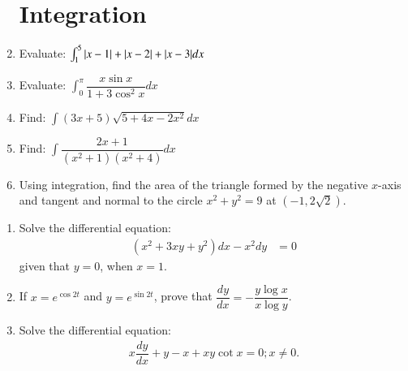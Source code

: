 \documentclass[12pt,-letter paper]{article}
\providecommand{\brak}[1]{\ensuremath{\left(#1\right)}}
\begin{document}
\begin{enumerate}
\section*{Integration}
\item Evaluate: $\int^5_1{\abs{x-1} + \abs{x-2} + \abs{x-3} dx}$
\item Evaluate: $ \int^{\pi}_0{\dfrac{x\sin{x}}{1 + 3\cos^2{x}}dx}$
\item Find: $\int{\brak{3x+5}\sqrt{5 + 4x - 2x^2}dx}$
\item Find: $\int{\dfrac{2x+1}{\brak{x^2 + 1}\brak{x^2 + 4}}dx}$
\item Using integration, find the area of the triangle formed by the negative $x$-axis and tangent and normal to the circle $x^2 + y^2 = 9$ at $\brak{-1,2\sqrt{2}}$.
\end{enumerate}

\begin{enumerate}
\section*{Differentiation}
\item Solve the differential equation:
\begin{align*}
	\brak{x^2 +3xy + y^2}dx - x^2dy &= 0
\end{align*}
given that $y=0$, when $x=1$.
\item If $x = e^{\cos{2t}}$ and $y = e^{\sin{2t}}$, prove that $ \dfrac{dy}{dx} = -\dfrac{y\log{x}}{x\log{y}}$.
\item Solve the differential equation:
\begin{align*}
x\dfrac{dy}{dx} + y - x + xy\cot{x} = 0; x \neq 0.
\end{align*}
\end{enumerate}
\end{document}
